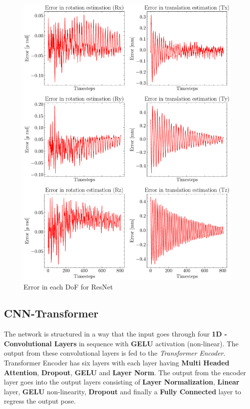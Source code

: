 \begin{figure}[H]
    \centering
    \includegraphics[scale=0.65]{images/fig_chapter4/nn_related/error_in_predicted_vs_ground_truth_resnet.pdf}
    \caption{Error in each DoF for ResNet}
    \label{fig:resnet_error}
\end{figure}


\subsection{CNN-Transformer}
The network is structured in a way that the input goes through four \textbf{1D - Convolutional Layers} in sequence with \textbf{GELU} activation (non-linear). The output from these convolutional layers is fed to the \textit{Transformer Encoder}. Transformer Encoder has six layers with each layer having \textbf{Multi Headed Attention}, \textbf{Dropout}, \textbf{GELU} and \textbf{Layer Norm}. The output from the encoder layer goes into the output layers consisting of \textbf{Layer Normalization}, \textbf{Linear} layer, \textbf{GELU} non-linearity, \textbf{Dropout} and finally a \textbf{Fully Connected} layer to regress the output pose.

